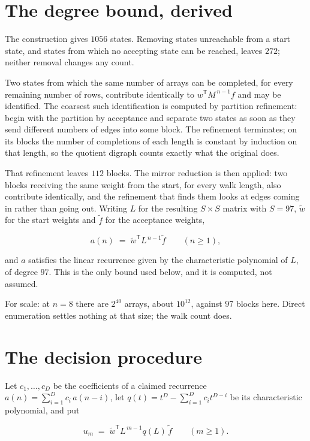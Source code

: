 \documentclass[11pt]{article}
\theoremstyle{definition}
\begin{document}
\section{The degree bound, derived}

The construction gives $1056$ states. Removing states unreachable from a start state, and states from which no accepting state can be reached, leaves $272$; neither removal changes any count.

Two states from which the same number of arrays can be completed, for every remaining number of rows, contribute identically to $w^{\mathsf T}M^{\,n-1}f$ and may be identified. The coarsest such identification is computed by partition refinement: begin with the partition by acceptance and separate two states as soon as they send different numbers of edges into some block. The refinement terminates; on its blocks the number of completions of each length is constant by induction on that length, so the quotient digraph counts exactly what the original does.

That refinement leaves $112$ blocks. The mirror reduction is then applied: two blocks receiving the same weight from the start, for every walk length, also contribute identically, and the refinement that finds them looks at edges coming in rather than going out. Writing $L$ for the resulting $S \times S$ matrix with $S = 97$, $\tilde w$ for the start weights and $\tilde f$ for the acceptance weights,

\[a(n) \;=\; \tilde w^{\mathsf T} L^{\,n-1} \tilde f \qquad (n \ge 1),\]

and $a$ satisfies the linear recurrence given by the characteristic polynomial of $L$, of degree $97$. This is the only bound used below, and it is computed, not assumed.

For scale: at $n = 8$ there are $2^{40}$ arrays, about $10^{12}$, against $97$ blocks here. Direct enumeration settles nothing at that size; the walk count does.

\section{The decision procedure}

Let $c_1,\dots,c_D$ be the coefficients of a claimed recurrence $a(n) = \sum_{i=1}^{D} c_i\,a(n-i)$, let $q(t) = t^{D} - \sum_{i=1}^{D} c_i t^{D-i}$ be its characteristic polynomial, and put

\[u_m \;=\; \tilde w^{\mathsf T} L^{\,m-1} q(L)\,\tilde f \qquad (m \ge 1).\]
\end{document}
